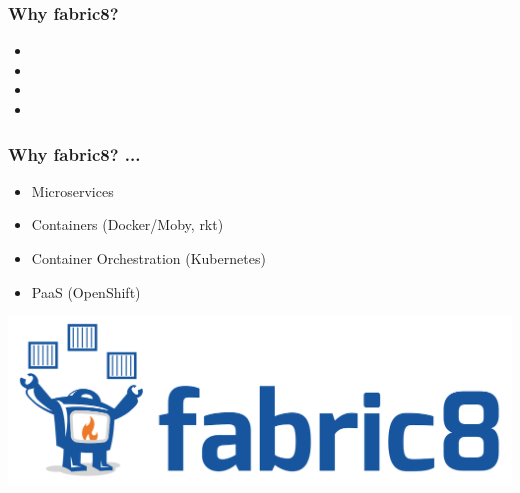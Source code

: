 \documentclass[aspectratio=169]{beamer}
\begin{document}
\begin{frame}
  \frametitle{Why fabric8?}

  \begin{itemize}
  \item<1-> 

  \item<2-> 

  \item<3-> 

  \item<4-> 

  \end{itemize}


\end{frame}

\begin{frame}
  \frametitle{Why fabric8? ...}

  \begin{itemize}
  \item<1-> Microservices
  \item<2-> Containers (Docker/Moby, rkt)
  \item<3-> Container Orchestration (Kubernetes)
  \item<4-> PaaS (OpenShift)
  \end{itemize}

\end{frame}

\begin{frame}
  \includegraphics[scale=.4]{images/fabric8_logo.png}
\end{frame}
\end{document}
